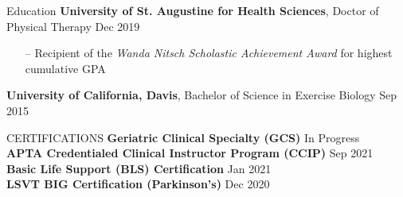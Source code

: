\documentclass{resume} %
\begin{document}
\vspace{-15pt}
\begin{rSection}{Education}
\textbf{University of St. Augustine for Health Sciences}, Doctor of Physical Therapy \hfill {Dec 2019}
\vspace*{-0.2cm}\begin{itemize}
    \item[--] Recipient of the \textit{Wanda Nitsch Scholastic Achievement Award} for highest cumulative GPA
\end{itemize}
\textbf{University of California, Davis}, Bachelor of Science in Exercise Biology \hfill {Sep 2015}
\end{rSection}


\begin{rSection}{CERTIFICATIONS}
\textbf{Geriatric Clinical Specialty (GCS)} \hfill In Progress\\
\textbf{APTA Credentialed Clinical Instructor Program (CCIP)} \hfill Sep 2021\\
\textbf{Basic Life Support (BLS) Certification} \hfill Jan 2021\\
\textbf{LSVT BIG Certification (Parkinson's)} \hfill Dec 2020
\end{rSection}
\end{document}

